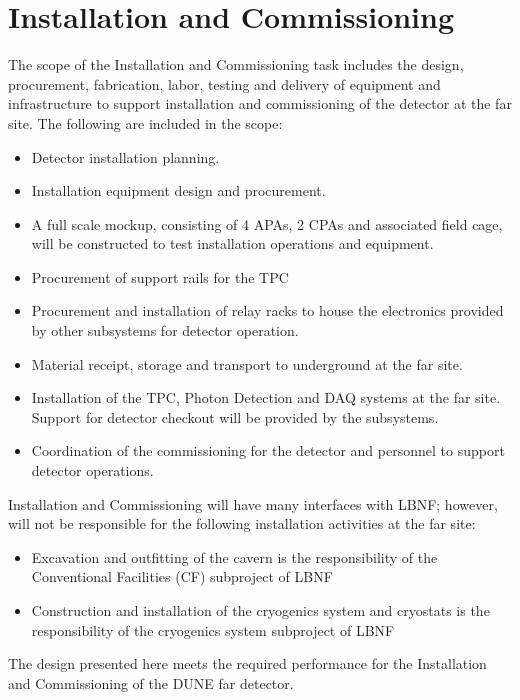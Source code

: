 \section{Installation and Commissioning}
\label{sec:detectors-fd-ref-install}

The scope of the Installation and Commissioning task includes the
design, procurement, fabrication, labor, testing and delivery of
equipment and infrastructure to support installation and commissioning
of the detector at the far site. The following are included in the
scope:
\begin{itemize}
\item Detector installation planning.
\item Installation equipment design and procurement.
\item A full scale mockup, consisting of 4 APAs, 2 CPAs and associated
  field cage, will be constructed to test installation operations and
  equipment.
\item Procurement of support rails for the TPC
\item Procurement and installation of relay racks to house the
  electronics provided by other subsystems for detector operation.
\item Material receipt, storage and transport to underground at the far site.
\item Installation of the TPC, Photon Detection and DAQ systems at the
  far site.  Support for detector checkout will be provided by the
  subsystems.
\item Coordination of the commissioning for the detector and personnel
  to support detector operations.
\end{itemize}

Installation and Commissioning will have many interfaces with LBNF;
however, will not be responsible for the following installation
activities at the far site:
\begin{itemize}
\item Excavation and outfitting of the cavern is the responsibility of
  the Conventional Facilities (CF) subproject of LBNF
\item Construction and installation of the cryogenics system and
  cryostats is the responsibility of the cryogenics system subproject
  of LBNF
\end{itemize}
The design presented here meets the required performance for the
Installation and Commissioning of the DUNE far detector.

